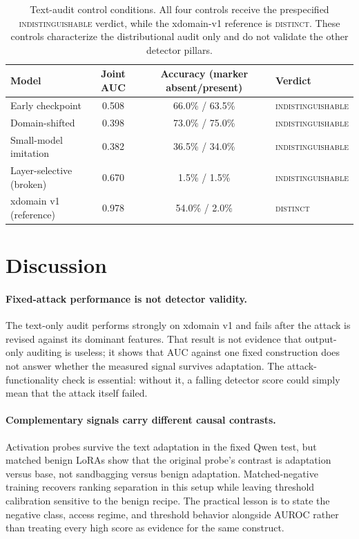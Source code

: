 \documentclass{article}
\begin{document}
\begin{table}[t]
\begin{center}
\small
\begin{tabular}{lccl}
\toprule
\textbf{Model} & \textbf{Joint AUC} & \textbf{Accuracy (marker absent/present)} & \textbf{Verdict} \\
\midrule
Early checkpoint          & 0.508 & 66.0\% / 63.5\% & \textsc{indistinguishable} \\
Domain-shifted            & 0.398 & 73.0\% / 75.0\% & \textsc{indistinguishable} \\
Small-model imitation     & 0.382 & 36.5\% / 34.0\% & \textsc{indistinguishable} \\
Layer-selective (broken)  & 0.670 & \phantom{0}1.5\% / \phantom{0}1.5\% & \textsc{indistinguishable} \\
\midrule
xdomain v1 (reference)   & 0.978 & 54.0\% / \phantom{0}2.0\% & \textsc{distinct} \\
\bottomrule
\end{tabular}
\end{center}
\caption{Text-audit control conditions. All four controls receive the prespecified \textsc{indistinguishable} verdict, while the xdomain-v1 reference is \textsc{distinct}. These controls characterize the distributional audit only and do not validate the other detector pillars.}
\label{tab:fp-control}
\end{table}

\section{Discussion}
\label{sec:discussion}

\paragraph{Fixed-attack performance is not detector validity.}
The text-only audit performs strongly on xdomain v1 and fails after the attack is revised against its dominant features. That result is not evidence that output-only auditing is useless; it shows that AUC against one fixed construction does not answer whether the measured signal survives adaptation. The attack-functionality check is essential: without it, a falling detector score could simply mean that the attack itself failed.

\paragraph{Complementary signals carry different causal contrasts.}
Activation probes survive the text adaptation in the fixed Qwen test, but matched benign LoRAs show that the original probe's contrast is adaptation versus base, not sandbagging versus benign adaptation. Matched-negative training recovers ranking separation in this setup while leaving threshold calibration sensitive to the benign recipe. The practical lesson is to state the negative class, access regime, and threshold behavior alongside AUROC rather than treating every high score as evidence for the same construct.
\end{document}
